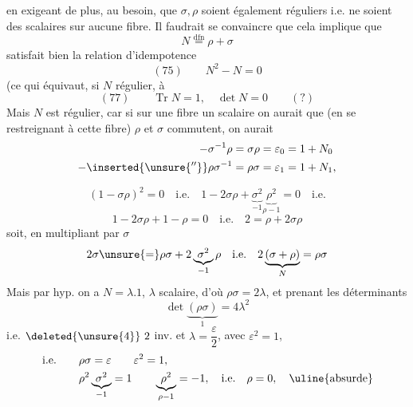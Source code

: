 en exigeant de plus, au besoin, que $\sigma,\rho$ soient également réguliers i.e. ne soient des scalaires sur aucune fibre. Il faudrait se convaincre que cela implique que
\[
N\mathrel{\overset{\mathrm{dfn}}{=}}\rho+\sigma
\]
satisfait bien la relation d'idempotence
\[
(75)\qquad N^2-N=0
\]
(ce qui équivaut, si $N$ régulier, à
\[
(77)\qquad \operatorname{Tr}N=1,\quad\det N=0\qquad (?)
\]
Mais $N$ est régulier, car si sur une fibre  un scalaire on aurait que (en se restreignant à cette fibre) $\rho$ et $\sigma$ commutent, on aurait
\[
\begin{aligned}
-\sigma^{-1}\rho&=\sigma\rho=\varepsilon_0=1+N_0\\
-\inserted{\unsure{''}}\rho\sigma^{-1}&=\rho\sigma=\varepsilon_1=1+N_1,
\end{aligned}
\]

\[
(1-\sigma\rho)^2=0\quad\text{i.e.}\quad
1-2\sigma\rho+\underbrace{\sigma^2}_{-1}\underbrace{\rho^2}_{\rho-1}=0\quad\text{i.e.}
\]
\[
1-2\sigma\rho+1-\rho=0\quad\text{i.e.}\quad 2=\rho+2\sigma\rho
\]
soit, en multipliant par $\sigma$
\[
2\sigma\unsure{=}\rho\sigma+2\underbrace{\sigma^2}_{-1}\rho
\quad\text{i.e.}\quad 2\underbrace{(\sigma+\rho)}_{N}=\rho\sigma
\]
Mais par hyp. on a $N=\lambda.1$, $\lambda$ scalaire, d'où $\rho\sigma=2\lambda$, et prenant les déterminants
\[
\det\underbrace{(\rho\sigma)}_{1}=4\lambda^2
\]
i.e. $\deleted{\unsure{4}}\ 2$ inv. et $\lambda=\dfrac{\varepsilon}{2}$, avec $\varepsilon^2=1$,
\[
\begin{aligned}
\text{i.e.}\qquad&\rho\sigma=\varepsilon\qquad\varepsilon^2=1,\\
&\rho^2\underbrace{\sigma^2}_{-1}=1\qquad\underbrace{\rho^2}_{\rho-1}=-1,\quad\text{i.e.}\quad\rho=0,\quad\text{\uline{absurde}}
\end{aligned}
\]

